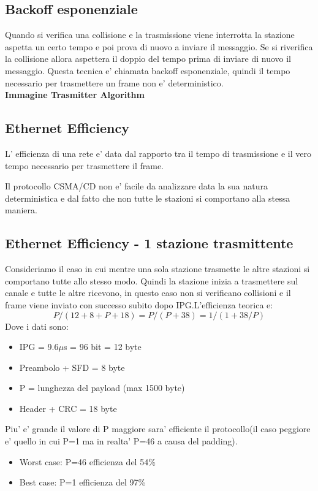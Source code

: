 \subsection{Backoff esponenziale}
Quando si verifica una collisione e la trasmissione viene interrotta la stazione aspetta un certo tempo e poi prova di nuovo a inviare il messaggio. Se si riverifica la collisione allora aspettera il doppio del tempo prima di inviare di nuovo il messaggio. Questa tecnica e' chiamata backoff esponenziale, quindi il tempo necessario per trasmettere un frame non e' deterministico. \\
\textbf{Immagine Trasmitter Algorithm}\\
\subsection{Ethernet Efficiency}
\begin{definition}
  L' efficienza di una rete e' data dal rapporto tra il tempo di trasmissione e il vero tempo necessario per trasmettere il frame. 
\end{definition}
Il protocollo CSMA/CD non e' facile da analizzare data la sua natura deterministica e dal fatto che non tutte le stazioni si comportano alla stessa maniera.
\subsection{Ethernet Efficiency - 1 stazione trasmittente}
Consideriamo il caso in cui mentre una sola stazione trasmette le altre stazioni si comportano tutte allo stesso modo. Quindi la stazione inizia a trasmettere sul canale e tutte le altre ricevono, in questo caso non si verificano collisioni e il frame viene inviato con successo subito dopo IPG.L'efficienza teorica e:
\begin{equation}
  P/(12+8+P+18) = P/(P+38) = 1/(1+38/P)
\end{equation}
Dove i dati sono:
\begin{itemize}
  \item IPG = 9.6$\mu$s = 96 bit = 12 byte
  \item Preambolo + SFD = 8 byte
  \item P = lunghezza del payload (max 1500 byte)
  \item Header + CRC = 18 byte
\end{itemize}
Piu' e' grande il valore di P maggiore sara' efficiente il protocollo(il caso peggiore e' quello in cui P=1 ma in realta' P=46 a causa del padding).
\begin{itemize}
  \item Worst case: P=46 \rightarrow efficienza del 54\%
  \item Best case: P=1 \rightarrow efficienza del 97\%
\end{itemize}
